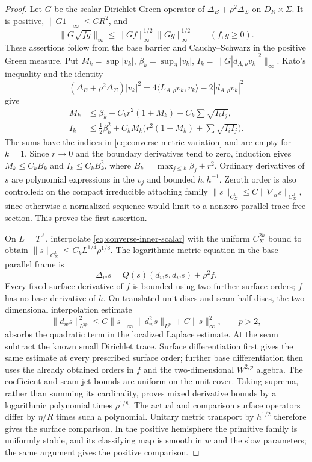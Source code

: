 \documentclass[11pt]{amsart}
\theoremstyle{definition}
\theoremstyle{remark}
\theoremstyle{plain}
\begin{document}
\begin{proof}
Let $G$ be the scalar Dirichlet Green operator of
$\Delta_B+\rho^2\Delta_\Sigma$ on $D_R^-\times\Sigma$.
It is positive, $\|G1\|_\infty\leq CR^2$, and
\[
 \|G\sqrt{fg}\|_\infty
       \leq\|Gf\|_\infty^{1/2}\|Gg\|_\infty^{1/2}
                         \qquad(f,g\geq0).
\]
These assertions follow from the base barrier and Cauchy--Schwarz
in the positive Green measure. Put
$M_k=\sup|v_k|$, $\beta_k=\sup_{\partial}|v_k|$,
$I_k=\|G|d_{A,\rho}v_k|^2\|_\infty$.
Kato's inequality and the identity
\[
 (\Delta_B+\rho^2\Delta_\Sigma)|v_k|^2
     =4\langle L_{A,\rho}v_k,v_k\rangle-2|d_{A,\rho}v_k|^2
\]
give
\begin{equation}\label{eq:converse-green-induction}
\begin{split}
 M_k&\leq\beta_k+C_kr^2(1+M_k)
                         +C_k\sum\sqrt{I_iI_j},\\
 I_k&\leq\tfrac12\beta_k^2+
             C_kM_k\bigl(r^2(1+M_k)+\sum\sqrt{I_iI_j}\bigr).
\end{split}
\end{equation}
The sums have the indices in \eqref{eq:converse-metric-variation}
and are empty for $k=1$. Since $r\to0$ and the boundary
derivatives tend to zero, induction gives
$M_k\leq C_k B_k$ and $I_k\leq C_kB_k^2$,
where $B_k=\max_{j\leq k}\beta_j+r^2$.
Ordinary derivatives of $s$ are polynomial expressions in the
$v_j$ and bounded $h,h^{-1}$. Zeroth order is also controlled:
on the compact irreducible attaching family
$\|s\|_{C^0_\Sigma}\leq C\|\nabla_\alpha s\|_{C^0_\Sigma}$,
since otherwise a normalized sequence would limit to a nonzero
parallel trace-free section. This proves the first assertion.

On $L=T^A$, interpolate \eqref{eq:converse-inner-scalar} with
the uniform $C_\Sigma^{2k}$ bound to obtain
$\|s\|_{C_\Sigma^k}\leq C_kL^{1/4}\rho^{1/8}$.
The logarithmic metric equation in the base-parallel frame is
\begin{equation}\label{eq:converse-base-metric-equation}
                \Delta_ws=Q(s)(d_ws,d_ws)+\rho^2f.
\end{equation}
Every fixed surface derivative of $f$ is bounded using two
further surface orders; $f$ has no base derivative of $h$.
On translated unit discs and seam half-discs, the two-dimensional
interpolation estimate
\[
 \|d_ws\|_{L^{2p}}^2\leq
     C\|s\|_\infty\|d_w^2s\|_{L^p}+C\|s\|_\infty^2,\qquad p>2,
\]
absorbs the quadratic term in the localized Laplace estimate.
At the seam subtract the known small Dirichlet trace. Surface
differentiation first gives the same estimate at every prescribed
surface order; further base differentiation then uses the already
obtained orders in $f$ and the two-dimensional $W^{2,p}$ algebra.
The coefficient and seam-jet bounds are uniform on the unit cover.
Taking suprema, rather than summing its cardinality, proves mixed
derivative bounds by a logarithmic polynomial times $\rho^{1/8}$.
The actual and comparison surface operators differ by
$\eta/R$ times such a polynomial. Unitary metric transport
by $h^{1/2}$ therefore gives the surface comparison.
In the positive hemisphere the primitive family is uniformly
stable, and its classifying map is smooth in $w$ and the slow
parameters; the same argument gives the positive comparison.


\end{proof}
\end{document}
